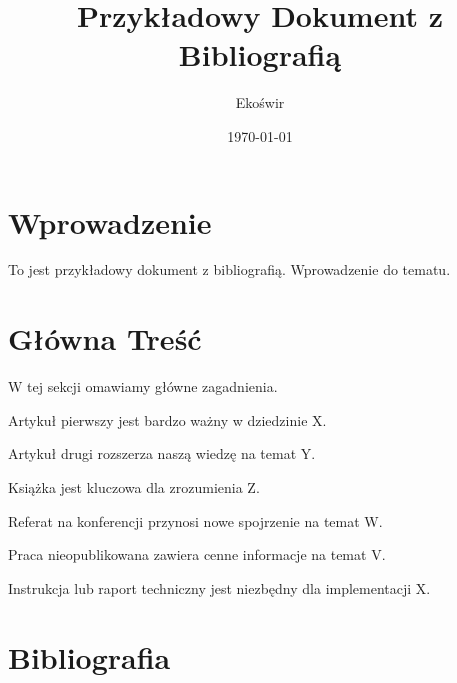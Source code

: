 \documentclass{article}
\begin{document}
\title{Przykładowy Dokument z Bibliografią}
\author{Ekoświr}
\date{\today}

\maketitle

\section{Wprowadzenie}

To jest przykładowy dokument z bibliografią. Wprowadzenie do tematu.

\section{Główna Treść}

W tej sekcji omawiamy główne zagadnienia.

Artykuł pierwszy \cite{article1} jest bardzo ważny w dziedzinie X.

Artykuł drugi \cite{article2} rozszerza naszą wiedzę na temat Y.

Książka \cite{book1} jest kluczowa dla zrozumienia Z.

Referat na konferencji \cite{conference1} przynosi nowe spojrzenie na temat W.

Praca nieopublikowana \cite{unpublished1} zawiera cenne informacje na temat V.

Instrukcja lub raport techniczny \cite{manual1} jest niezbędny dla implementacji X.

\section{Bibliografia}



\end{document}
